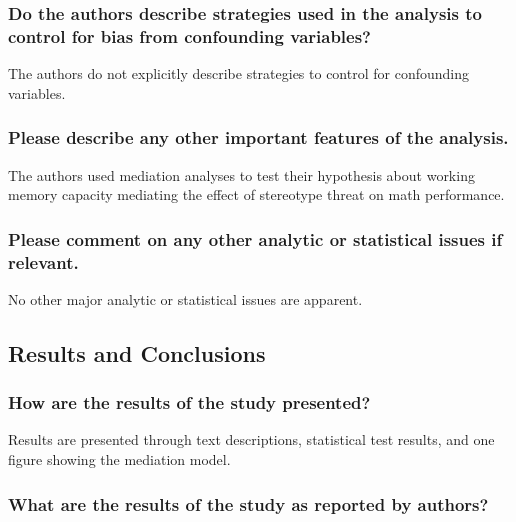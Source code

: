 \documentclass[
  doc, a4paper]{apa7}
\begin{document}
\subsubsection{Do the authors describe strategies used in the analysis to control for bias from confounding variables?}\label{do-the-authors-describe-strategies-used-in-the-analysis-to-control-for-bias-from-confounding-variables}

The authors do not explicitly describe strategies to control for confounding variables.

\subsubsection{Please describe any other important features of the analysis.}\label{please-describe-any-other-important-features-of-the-analysis.}

The authors used mediation analyses to test their hypothesis about working memory capacity mediating the effect of stereotype threat on math performance.

\subsubsection{Please comment on any other analytic or statistical issues if relevant.}\label{please-comment-on-any-other-analytic-or-statistical-issues-if-relevant.}

No other major analytic or statistical issues are apparent.

\subsection{Results and Conclusions}\label{results-and-conclusions}

\subsubsection{How are the results of the study presented?}\label{how-are-the-results-of-the-study-presented}

Results are presented through text descriptions, statistical test results, and one figure showing the mediation model.

\subsubsection{What are the results of the study as reported by authors?}\label{what-are-the-results-of-the-study-as-reported-by-authors}
\end{document}
